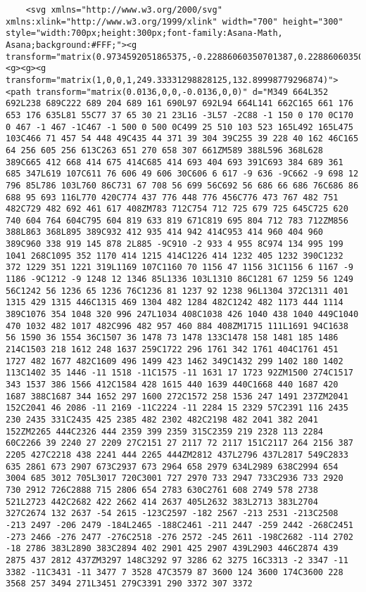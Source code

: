 \documentclass[
]{article}
\begin{document}
\begin{verbatim}
    <svg xmlns="http://www.w3.org/2000/svg" xmlns:xlink="http://www.w3.org/1999/xlink" width="700" height="300" style="width:700px;height:300px;font-family:Asana-Math, Asana;background:#FFF;"><g transform="matrix(0.9734592051865375,-0.22886060350701387,0.22886060350701387,0.9734592051865375,-21.56885920974753,68.62892510213061)"><g><g><g transform="matrix(1,0,0,1,249.33331298828125,132.89998779296874)"><path transform="matrix(0.0136,0,0,-0.0136,0,0)" d="M349 664L352 692L238 689C222 689 204 689 161 690L97 692L94 664L141 662C165 661 176 653 176 635L81 55C77 37 65 30 21 23L16 -3L57 -2C88 -1 150 0 170 0C170 0 467 -1 467 -1C467 -1 500 0 500 0C499 25 510 103 523 165L492 165L475 103C466 71 457 54 448 49C435 44 371 39 304 39C255 39 228 40 162 46C165 64 256 605 256 613C263 651 270 658 307 661ZM589 388L596 368L628 389C665 412 668 414 675 414C685 414 693 404 693 391C693 384 689 361 685 347L619 107C611 76 606 49 606 30C606 6 617 -9 636 -9C662 -9 698 12 796 85L786 103L760 86C731 67 708 56 699 56C692 56 686 66 686 76C686 86 688 95 693 116L770 420C774 437 776 448 776 456C776 473 767 482 751 482C729 482 692 461 617 408ZM783 712C754 712 725 679 725 645C725 620 740 604 764 604C795 604 819 633 819 671C819 695 804 712 783 712ZM856 388L863 368L895 389C932 412 935 414 942 414C953 414 960 404 960 389C960 338 919 145 878 2L885 -9C910 -2 933 4 955 8C974 134 995 199 1041 268C1095 352 1170 414 1215 414C1226 414 1232 405 1232 390C1232 372 1229 351 1221 319L1169 107C1160 70 1156 47 1156 31C1156 6 1167 -9 1186 -9C1212 -9 1248 12 1346 85L1336 103L1310 86C1281 67 1259 56 1249 56C1242 56 1236 65 1236 76C1236 81 1237 92 1238 96L1304 372C1311 401 1315 429 1315 446C1315 469 1304 482 1284 482C1242 482 1173 444 1114 389C1076 354 1048 320 996 247L1034 408C1038 426 1040 438 1040 449C1040 470 1032 482 1017 482C996 482 957 460 884 408ZM1715 111L1691 94C1638 56 1590 36 1554 36C1507 36 1478 73 1478 133C1478 158 1481 185 1486 214C1503 218 1612 248 1637 259C1722 296 1761 342 1761 404C1761 451 1727 482 1677 482C1609 496 1499 423 1462 349C1432 299 1402 180 1402 113C1402 35 1446 -11 1518 -11C1575 -11 1631 17 1723 92ZM1500 274C1517 343 1537 386 1566 412C1584 428 1615 440 1639 440C1668 440 1687 420 1687 388C1687 344 1652 297 1600 272C1572 258 1536 247 1491 237ZM2041 152C2041 46 2086 -11 2169 -11C2224 -11 2284 15 2329 57C2391 116 2435 230 2435 331C2435 425 2385 482 2302 482C2198 482 2041 382 2041 152ZM2265 444C2326 444 2359 399 2359 315C2359 219 2328 113 2284 60C2266 39 2240 27 2209 27C2151 27 2117 72 2117 151C2117 264 2156 387 2205 427C2218 438 2241 444 2265 444ZM2812 437L2796 437L2817 549C2833 635 2861 673 2907 673C2937 673 2964 658 2979 634L2989 638C2994 654 3004 685 3012 705L3017 720C3001 727 2970 733 2947 733C2936 733 2920 730 2912 726C2888 715 2806 654 2783 630C2761 608 2749 578 2738 521L2723 442C2682 422 2662 414 2637 405L2632 383L2713 383L2704 327C2674 132 2637 -54 2615 -123C2597 -182 2567 -213 2531 -213C2508 -213 2497 -206 2479 -184L2465 -188C2461 -211 2447 -259 2442 -268C2451 -273 2466 -276 2477 -276C2518 -276 2572 -245 2611 -198C2682 -114 2702 -18 2786 383L2890 383C2894 402 2901 425 2907 439L2903 446C2874 439 2875 437 2812 437ZM3297 148C3292 97 3286 62 3275 16C3313 -2 3347 -11 3382 -11C3431 -11 3477 7 3528 47C3579 87 3600 124 3600 174C3600 228 3568 257 3494 271L3451 279C3391 290 3372 307 3372 
\end{verbatim}
\end{document}
